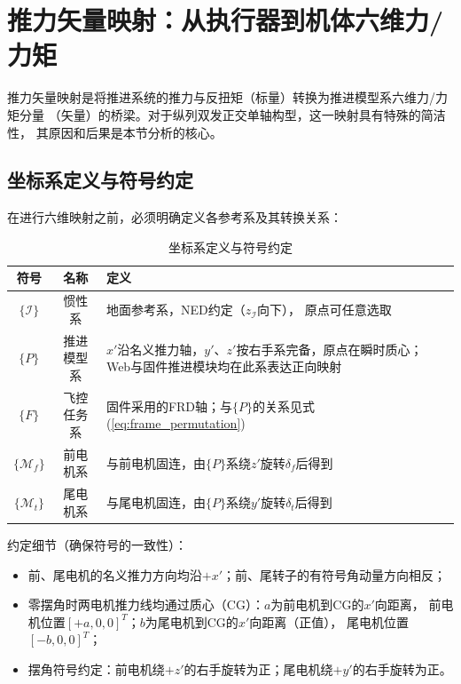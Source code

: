 \section{推力矢量映射：从执行器到机体六维力/力矩}
\label{sec:mapping}

推力矢量映射是将推进系统的推力与反扭矩（标量）转换为推进模型系六维力/力矩分量
（矢量）的桥梁。对于纵列双发正交单轴构型，这一映射具有特殊的简洁性，
其原因和后果是本节分析的核心。

\subsection{坐标系定义与符号约定}

在进行六维映射之前，必须明确定义各参考系及其转换关系：

\begin{table}[H]
\centering
\caption{坐标系定义与符号约定}
\begin{tabularx}{\textwidth}{c c >{\raggedright\arraybackslash}X}
\toprule
符号 & 名称 & 定义 \\
\midrule
$\{\mathcal{I}\}$ & 惯性系 & 地面参考系，NED约定（$z_{\mathcal{I}}$向下），
                      原点可任意选取 \\
$\{P\}$ & 推进模型系 & $x'$沿名义推力轴，$y'$、$z'$按右手系完备，原点在瞬时质心；
                      Web与固件推进模块均在此系表达正向映射 \\
$\{F\}$ & 飞控任务系 & 固件采用的FRD轴；与$\{P\}$的关系见式(\ref{eq:frame_permutation}) \\
$\{\mathcal{M}_f\}$ & 前电机系 & 与前电机固连，由$\{P\}$系绕$z'$旋转$\delta_f$后得到 \\
$\{\mathcal{M}_t\}$ & 尾电机系 & 与尾电机固连，由$\{P\}$系绕$y'$旋转$\delta_t$后得到 \\
\bottomrule
\end{tabularx}
\end{table}

约定细节（确保符号的一致性）：
\begin{itemize}
    \item 前、尾电机的名义推力方向均沿$+x'$；前、尾转子的有符号角动量方向相反；
    \item 零摆角时两电机推力线均通过质心（CG）：$a$为前电机到CG的$x'$向距离，
          前电机位置$[+a, 0, 0]^T$；$b$为尾电机到CG的$x'$向距离（正值），
          尾电机位置$[-b, 0, 0]^T$；
    \item 摆角符号约定：前电机绕$+z'$的右手旋转为正；尾电机绕$+y'$的右手旋转为正。
\end{itemize}

